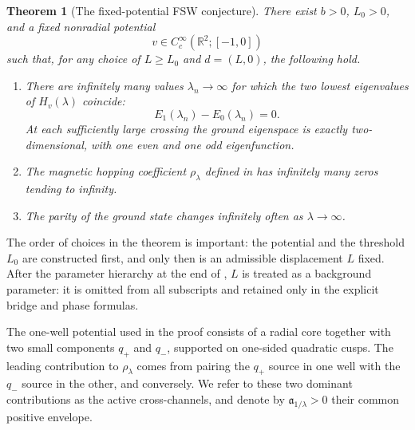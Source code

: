 \documentclass[11pt]{article}
\newtheorem{theorem}{Theorem}[section]
\newcommand{\R}{\mathbb R}
\begin{document}
\begin{theorem}[The fixed-potential FSW conjecture]\label{thm:main}
There exist $b>0$, $L_0>0$, and a fixed nonradial potential
\[
 v\in C_c^\infty(\R^2;[-1,0])
\]
such that, for any choice of $L\ge L_0$ and $d=(L,0)$, the following hold.
\begin{enumerate}[label=\textup{(\roman*)},leftmargin=2.5em]
\item There are infinitely many values $\lambda_n\to\infty$ for which the
two lowest eigenvalues of $H_v(\lambda)$ coincide:
\[
 E_1(\lambda_n)-E_0(\lambda_n)=0.
\]
At each sufficiently large crossing the ground eigenspace is exactly
two-dimensional, with one even and one odd eigenfunction.
\item The magnetic hopping coefficient $\rho_\lambda$ defined in
 has infinitely many zeros tending to infinity.
\item The parity of the ground state changes infinitely often as
$\lambda\to\infty$.
\end{enumerate}
\end{theorem}

The order of choices in the theorem is important: the potential and the
threshold $L_0$ are constructed first, and only then is an admissible
displacement $L$ fixed. After the parameter hierarchy at the end of
, $L$ is treated as a background parameter:
it is omitted from all subscripts and retained only in the explicit bridge
and phase formulas.

The one-well potential used in the proof consists of a radial core together
with two small components $q_+$ and $q_-$, supported on one-sided quadratic
cusps. The leading contribution to $\rho_\lambda$ comes from pairing the
$q_+$ source in one well with the $q_-$ source in the other, and conversely.
We refer to these two dominant contributions as the active cross-channels,
and denote by $\mathfrak a_{1/\lambda}>0$ their common positive envelope.
\end{document}
